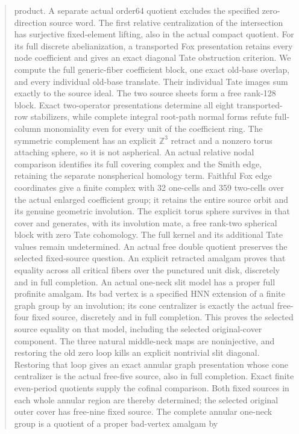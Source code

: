 \documentclass[11pt,a4paper]{article}
\begin{document}
\begin{abstract}
product. A separate actual order64 quotient excludes the specified
zero-direction source word. The first relative centralization of the
intersection has surjective fixed-element lifting, also in the actual
compact quotient. For its full discrete abelianization, a transported
Fox presentation retains every node coefficient and gives an exact
diagonal Tate obstruction criterion. We compute the full generic-fiber
coefficient block, one exact old-base overlap, and every individual
old-base translate. Their individual Tate images sum exactly to the
source ideal. The two source sheets form a free rank-128 block.
Exact two-operator presentations determine all eight transported-row
stabilizers, while complete integral root-path normal forms refute
full-column monomiality even for every unit of the coefficient ring.
The symmetric complement has an explicit $\mathbb Z^3$ retract and a
nonzero torus attaching sphere, so it is not aspherical. An actual
relative nodal comparison identifies its full covering complex and the
Smith edge, retaining the separate nonspherical homology term. Faithful
Fox edge coordinates give a finite complex with 32 one-cells and 359
two-cells over the actual enlarged coefficient group; it retains the
entire source orbit and its genuine geometric involution. The explicit
torus sphere survives in that cover and generates, with its involution
mate, a free rank-two spherical block with zero Tate cohomology. The
full kernel and its additional Tate values remain undetermined. An actual
free double quotient preserves the selected fixed-source question.
An explicit retracted amalgam proves that equality across all critical
fibers over the punctured unit disk, discretely and in full completion.
An actual one-neck slit model has a proper full profinite amalgam.
Its bad vertex is a specified HNN extension of a finite graph group by
an involution; its cone centralizer is exactly the actual free-four
fixed source, discretely and in full completion. This proves the selected
source equality on that model, including the selected original-cover
component. The three natural middle-neck maps are noninjective, and
restoring the old zero loop kills an explicit nontrivial slit diagonal.
Restoring that loop gives an exact annular graph presentation whose
cone centralizer is the actual free-five source, also in full completion.
Exact finite even-period quotients supply the cofinal comparison. Both
fixed sources in each whole annular region are thereby determined; the
selected original outer cover has free-nine fixed source. The complete
annular one-neck group is a quotient of a proper bad-vertex amalgam by

\end{abstract}
\end{document}
